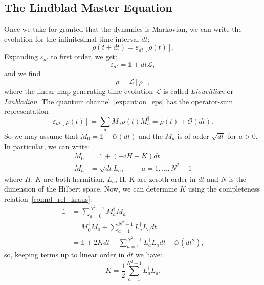 \subsection{The Lindblad Master Equation}
Once we take for granted that the dynamics is Markovian, we can write the evolution for the infinitesimal time interval $dt$:
\begin{equation}
    \rho(t+dt) = \varepsilon_{dt}[\rho(t)].
\end{equation}
Expanding $\varepsilon_{dt}$ to first order, we get:
\begin{equation}
\label{expantion_eps}
    \varepsilon_{dt} = \mathds{1} + dt\mathcal{L},
\end{equation}
and we find
\begin{equation}
    \Dot{\rho} = \mathcal{L}[\rho],
\end{equation}
where the linear map generating time evolution $\mathcal{L}$ is called \emph{Liouvillian} or \emph{Linbladian}. 
The quantum channel~\ref{expantion_eps} has the operator-sum representation
\begin{equation}
\label{op_sum_repr}
    \varepsilon_{dt}[\rho(t)] = \sum_a M_a \rho(t) M_a^\dagger = \rho(t) + \mathcal{O}(dt).
\end{equation}
So we may assume that $M_0 = \mathds{1} + \mathcal{O}(dt)$ and the $M_a$ is of order $\sqrt{dt}$ for $a>0$. In particular, we can write:
\begin{align}
    M_0 &= \mathds{1} + (-iH+K)dt \\
    M_a &= \sqrt{dt}L_a, \hspace{1cm} a = 1,\dots,N^2-1
\end{align}
where $H$, $K$ are both hermitian, $L_a$, H, K are zeroth order in $dt$ and $N$ is the dimension of the Hilbert space.
Now, we can determine $K$ using the completeness relation~\ref{compl_rel_kraus}:
\begin{equation}
\begin{split}
    \mathds{1} &= \sum_{a=0}^{N^2-1} M_a^\dagger M_a \\
               &= M_0^\dagger M_0 + \sum_{a=1}^{N^2-1} L_a^\dagger L_a dt \\
               &= \mathds{1} +2Kdt + \sum_{a=1}^{N^2-1} L_a^\dagger L_a dt + \mathcal{O}(dt^2),
\end{split}
\end{equation}
so, keeping terms up to linear order in $dt$ we have:
\begin{equation*}
    K = \frac{1}{2} \sum_{a=1}^{N^2-1} L_a^\dagger L_a.
\end{equation*}
